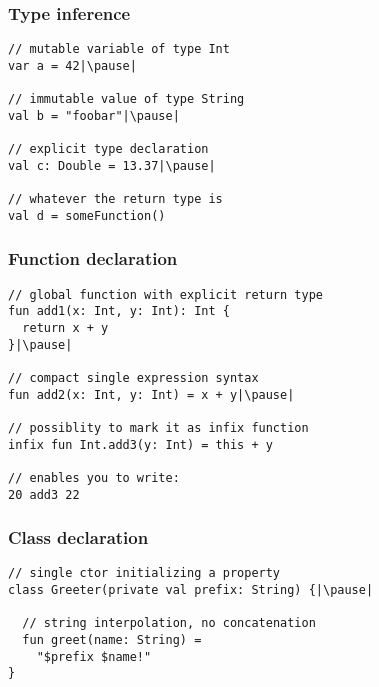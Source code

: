 

\begin{frame}[fragile] \frametitle{Type inference}
\pause
\begin{lstlisting}
// mutable variable of type Int
var a = 42|\pause|

// immutable value of type String
val b = "foobar"|\pause|

// explicit type declaration
val c: Double = 13.37|\pause|

// whatever the return type is
val d = someFunction()
\end{lstlisting}
\end{frame}


\begin{frame}[fragile] \frametitle{Function declaration}
\pause
\begin{lstlisting}
// global function with explicit return type
fun add1(x: Int, y: Int): Int {
  return x + y
}|\pause|

// compact single expression syntax
fun add2(x: Int, y: Int) = x + y|\pause|

// possiblity to mark it as infix function
infix fun Int.add3(y: Int) = this + y

// enables you to write:
20 add3 22
\end{lstlisting}
\end{frame}


\begin{frame}[fragile] \frametitle{Class declaration}
\pause
\begin{lstlisting}
// single ctor initializing a property
class Greeter(private val prefix: String) {|\pause|

  // string interpolation, no concatenation
  fun greet(name: String) =
    "$prefix $name!"
}
\end{lstlisting}
\end{frame}


